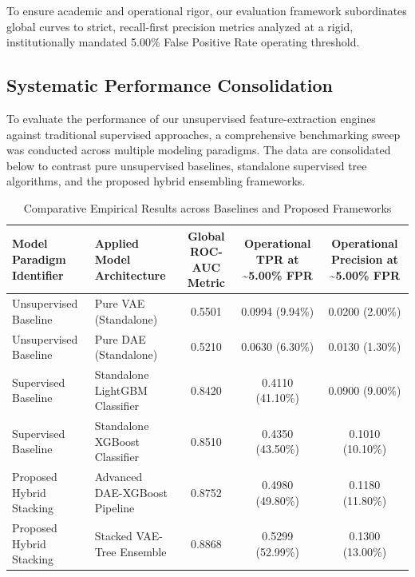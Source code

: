 \documentclass[11pt,a4paper]{report}
\begin{document}
To ensure academic and operational rigor, our evaluation framework subordinates global curves to strict, recall-first precision metrics analyzed at a rigid, institutionally mandated 5.00\% False Positive Rate operating threshold.

\subsection{Systematic Performance Consolidation}
To evaluate the performance of our unsupervised feature-extraction engines against traditional supervised approaches, a comprehensive benchmarking sweep was conducted across multiple modeling paradigms. The data are consolidated below to contrast pure unsupervised baselines, standalone supervised tree algorithms, and the proposed hybrid ensembling frameworks.

\begin{table}[htbp]
\centering
\caption{Comparative Empirical Results across Baselines and Proposed Frameworks}
\begin{tabular}{@{}p{3cm} p{3.5cm} c c c@{}}
\toprule
\textbf{Model Paradigm Identifier} & \textbf{Applied Model Architecture} & \textbf{Global ROC-AUC Metric} & \textbf{Operational TPR at \textasciitilde 5.00\% FPR} & \textbf{Operational Precision at \textasciitilde 5.00\% FPR} \\
\midrule
Unsupervised Baseline & Pure VAE (Standalone) & 0.5501 & 0.0994 (9.94\%) & 0.0200 (2.00\%) \\
Unsupervised Baseline & Pure DAE (Standalone) & 0.5210 & 0.0630 (6.30\%) & 0.0130 (1.30\%) \\
Supervised Baseline & Standalone LightGBM Classifier & 0.8420 & 0.4110 (41.10\%) & 0.0900 (9.00\%) \\
Supervised Baseline & Standalone XGBoost Classifier & 0.8510 & 0.4350 (43.50\%) & 0.1010 (10.10\%) \\
Proposed Hybrid Stacking & Advanced DAE-XGBoost Pipeline & 0.8752 & 0.4980 (49.80\%) & 0.1180 (11.80\%) \\
Proposed Hybrid Stacking & Stacked VAE-Tree Ensemble & 0.8868 & 0.5299 (52.99\%) & 0.1300 (13.00\%) \\
\bottomrule
\end{tabular}
\label{tab:empirical_results}
\end{table}
\end{document}
